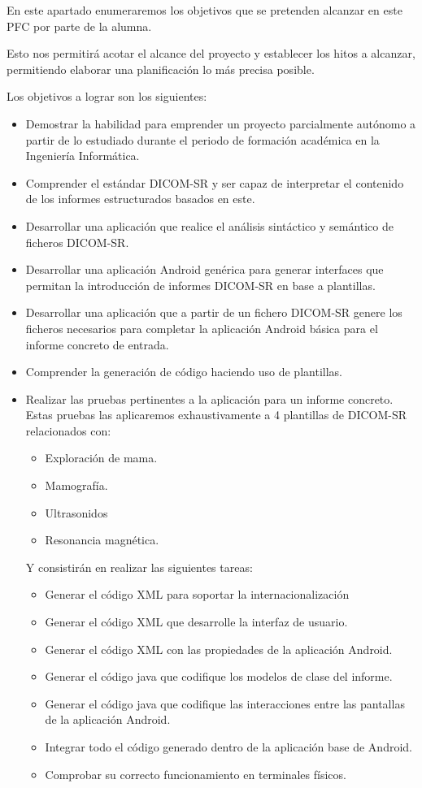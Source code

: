 
En este apartado enumeraremos los objetivos que se pretenden alcanzar en este PFC por parte de la alumna.\par
Esto nos permitirá acotar el alcance del proyecto y establecer los hitos a alcanzar, permitiendo elaborar una planificación lo más precisa posible.\medskip\par

Los objetivos a lograr son los siguientes:
\begin{itemize}
	\item Demostrar la habilidad para emprender un proyecto parcialmente autónomo a partir de lo estudiado durante el periodo de formación académica en la Ingeniería Informática.
	\item Comprender el estándar DICOM-SR y ser capaz de interpretar el contenido de los informes estructurados basados en este.
	\item Desarrollar una aplicación que realice el análisis sintáctico y semántico de ficheros DICOM-SR.
	\item Desarrollar una aplicación Android genérica para generar interfaces que permitan la introducción de informes DICOM-SR en base a plantillas.
	\item Desarrollar una aplicación que a partir de un fichero DICOM-SR genere los ficheros necesarios para completar la aplicación Android básica para el informe concreto de entrada. 
	\item Comprender la generación de código haciendo uso de plantillas.
	\item Realizar las pruebas pertinentes a la aplicación para un informe concreto. Estas pruebas las aplicaremos exhaustivamente a 4 plantillas de DICOM-SR relacionados con:
	\begin{itemize}
		\item Exploración de mama.
		\item Mamografía.
		\item Ultrasonidos
		\item Resonancia magnética.
	\end{itemize}
	Y consistirán en realizar las siguientes tareas:
	\begin{itemize}
		\item Generar el código XML para soportar la internacionalización
		\item Generar el código XML que desarrolle la interfaz de usuario. 
		\item Generar el código XML con las propiedades de la aplicación Android.
		\item Generar el código java que codifique los modelos de clase del informe. 
		\item Generar el código java que codifique las interacciones entre las pantallas de la aplicación Android.
		\item Integrar todo el código generado dentro de la aplicación base de Android. 
		\item Comprobar su correcto funcionamiento en terminales físicos.
	\end{itemize}
\end{itemize}
\medskip\par


